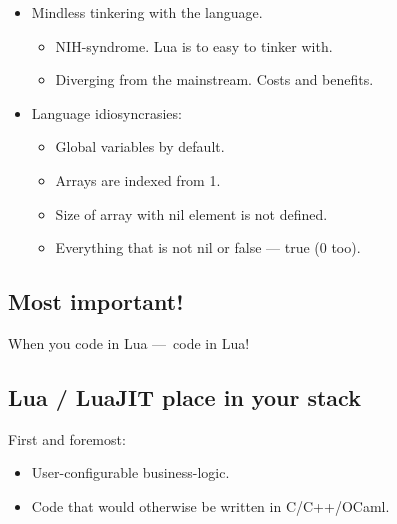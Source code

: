 \documentclass[aspectratio=169,handout,bigger]{beamer}
\begin{document}
\begin{frame}
  \begin{itemize}
    \item Mindless tinkering with the language.
    \begin{itemize}
      \item NIH-syndrome. Lua is to easy to tinker with.
      \item Diverging from the mainstream. Costs and benefits.
    \end{itemize}
    \item Language idiosyncrasies:
    \begin{itemize}
      \item Global variables by default.
      \item Arrays are indexed from 1.
      \item Size of array with nil element is not defined.
      \item Everything that is not nil or false — true (0 too).
    \end{itemize}
  \end{itemize}
\end{frame}


\subsection*{Most important!}

\begin{frame}
  \centering When you code in Lua — code in Lua!
\end{frame}


\subsection*{Lua / LuaJIT place in your stack}

\begin{frame}
  First and foremost:

  \begin{itemize}
    \item User-configurable business-logic.
    \item Code that would otherwise be written in C/C++/OCaml.
  \end{itemize}
\end{frame}
\end{document}
